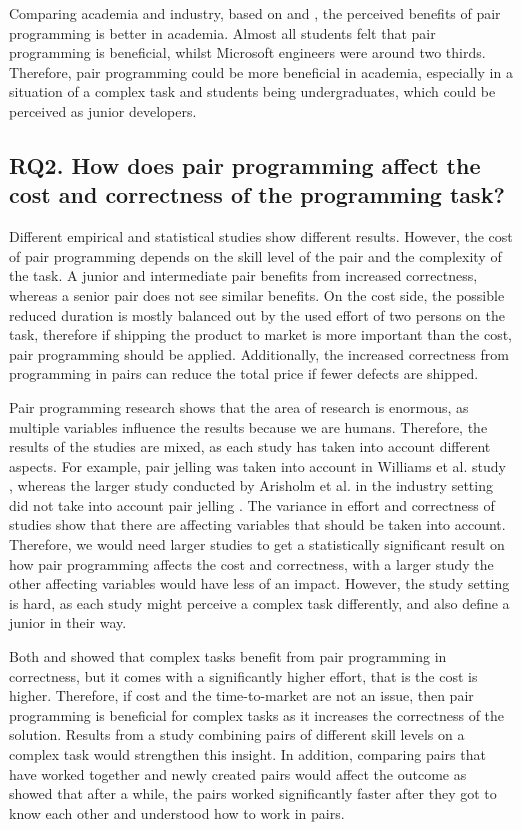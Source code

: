 \documentclass[conference]{IEEEtran}
\begin{document}
Comparing academia and industry, based on \cite{Williams2000Strengthening} and \cite{10.1145/1414004.1414026}, the perceived benefits of pair programming is better in academia. Almost all students felt that pair programming is beneficial, whilst Microsoft engineers were around two thirds. Therefore, pair programming could be more beneficial in academia, especially in a situation of a complex task and students being undergraduates, which could be perceived as junior developers.

    
\subsection{RQ2. How does pair programming affect the cost and correctness of the programming task?}

Different empirical and statistical studies show different results. However, the cost of pair programming depends on the skill level of the pair and the complexity of the task. A junior and intermediate pair benefits from increased correctness, whereas a senior pair does not see similar benefits. On the cost side, the possible reduced duration is mostly balanced out by the used effort of two persons on the task, therefore if shipping the product to market is more important than the cost, pair programming should be applied. Additionally, the increased correctness from programming in pairs can reduce the total price if fewer defects are shipped.

Pair programming research shows that the area of research is enormous, as multiple variables influence the results because we are humans. Therefore, the results of the studies are mixed, as each study has taken into account different aspects. For example, pair jelling was taken into account in Williams et al. study \cite{Williams2000Strengthening}, whereas the larger study conducted by Arisholm et al. in the industry setting did not take into account pair jelling \cite{Arisholm2007Evaluating}.  The variance in effort and correctness of studies show that there are affecting variables that should be taken into account. Therefore, we would need larger studies to get a statistically significant result on how pair programming affects the cost and correctness, with a larger study the other affecting variables would have less of an impact. However, the study setting is hard, as each study might perceive a complex task differently, and also define a junior in their way.

Both \cite{Arisholm2007Evaluating} and \cite{10.1145/1159733.1159749} showed that complex tasks benefit from pair programming in correctness, but it comes with a significantly higher effort, that is the cost is higher. Therefore, if cost and the time-to-market are not an issue, then pair programming is beneficial for complex tasks as it increases the correctness of the solution. Results from a study combining pairs of different skill levels on a complex task would strengthen this insight. In addition, comparing pairs that have worked together and newly created pairs would affect the outcome as \cite{Williams2000Strengthening, 1541842} showed that after a while, the pairs worked significantly faster after they got to know each other and understood how to work in pairs.
\end{document}
